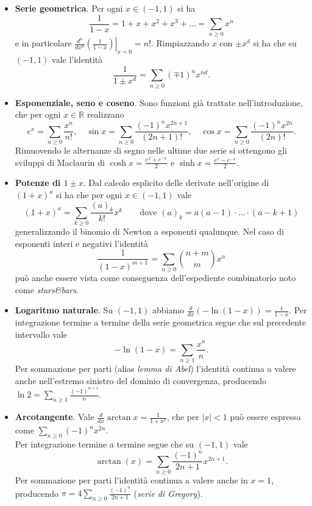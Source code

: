 \documentclass[a4paper,twoside]{article}
\newcommand{\R}{\mathbb{R}}
\theoremstyle{definition}
\numberwithin{theorem}{section}
\begin{document}
\begin{itemize}
 \item \textbf{Serie geometrica}. Per ogni $x\in(-1,1)$ si ha 
 $$ \frac{1}{1-x}=1+x+x^2+x^3+\ldots = \sum_{n\geq 0}x^n $$
 e in particolare $\left.\frac{d^n}{dx^n}\left(\frac{1}{1-x}\right)\right|_{x=0}=n!$. Rimpiazzando $x$ con $\pm x^d$ si ha che su $(-1,1)$ vale l'identità 
 $$ \frac{1}{1\pm x^d} = \sum_{n\geq 0}(\mp 1)^n x^{nd}. $$
 \item \textbf{Esponenziale, seno e coseno}. Sono funzioni già trattate nell'introduzione, che per ogni $x\in\R$ realizzano 
 $$ e^x = \sum_{n\geq 0}\frac{x^n}{n!},\quad \sin x=\sum_{n\geq 0}\frac{(-1)^n x^{2n+1}}{(2n+1)!}, \quad \cos x=\sum_{n\geq 0}\frac{(-1)^n x^{2n}}{(2n)!}. $$
 Rimuovendo le alternanze di segno nelle ultime due serie si ottengono gli sviluppi di Maclaurin di $\cosh x=\frac{e^x+e^{-x}}{2}$ e $\sinh x=\frac{e^x-e^{-x}}{2}$.
 \item \textbf{Potenze di $1\pm x$}. Dal calcolo esplicito delle derivate nell'origine di $(1+x)^{a}$ si ha che per ogni $x\in(-1,1)$ vale 
 $$ (1+x)^a = \sum_{k\geq 0}\frac{(a)_k}{k!} x^k\qquad\text{dove }(a)_k = a(a-1)\cdot\ldots\cdot (a-k+1) $$
 generalizzando il binomio di Newton a esponenti qualunque. Nel caso di esponenti interi e negativi l'identità 
 $$ \frac{1}{(1-x)^{m+1}} = \sum_{n\geq 0}\binom{n+m}{m} x^n $$
 può anche essere vista come conseguenza dell'espediente combinatorio noto come \emph{stars\&bars}.
 \item \textbf{Logaritmo naturale}. Su $(-1,1)$ abbiamo $\frac{d}{dx}\left(-\ln(1-x)\right)=\frac{1}{1-x}$. Per integrazione termine a termine della serie geometrica segue che sul precedente intervallo vale 
 $$ -\ln(1-x) = \sum_{n\geq 1}\frac{x^n}{n}. $$
 Per sommazione per parti (alias \emph{lemma di Abel}) l'identità continua a valere anche nell'estremo sinistro del dominio di convergenza, producendo $\ln 2 = \sum_{n\geq 1}\frac{(-1)^{n+1}}{n}$.
 \item \textbf{Arcotangente}. Vale $\frac{d}{dx}\arctan x=\frac{1}{1+x^2}$, che per $|x|<1$ può essere espressa come $\sum_{n\geq 0}(-1)^n x^{2n}$.\\
 Per integrazione termine a termine segue che su $(-1,1)$ vale 
 $$ \arctan(x) = \sum_{n\geq 0}\frac{(-1)^n}{2n+1} x^{2n+1}. $$
 Per sommazione per parti l'identità continua a valere anche in $x=1$,\\ producendo $\pi = 4\sum_{n\geq 0}\frac{(-1)^n}{2n+1}$ (\emph{serie di Gregory}).
 
\end{itemize}
\end{document}
